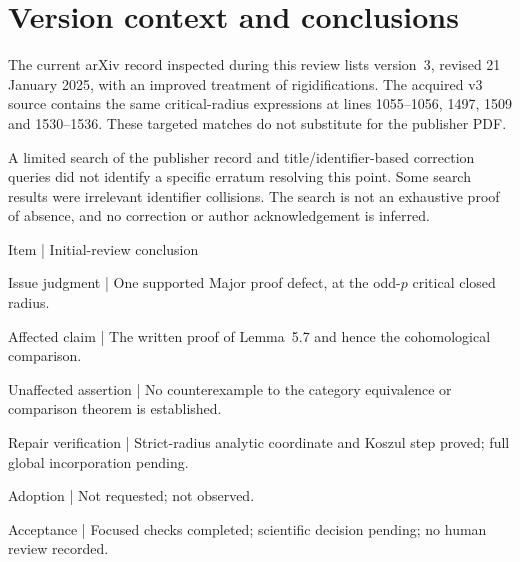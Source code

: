 \documentclass[10pt]{article}
\begin{document}
\section*{Version context and conclusions}
The current arXiv record inspected during this review lists version 3, revised 21 January 2025, with an improved treatment of rigidifications. The acquired v3 source contains the same critical-radius expressions at lines 1055–1056, 1497, 1509 and 1530–1536. These targeted matches do not substitute for the publisher PDF.\par
A limited search of the publisher record and title/identifier-based correction queries did not identify a specific erratum resolving this point. Some search results were irrelevant identifier collisions. The search is not an exhaustive proof of absence, and no correction or author acknowledgement is inferred.\par
Item | Initial-review conclusion\par
Issue judgment | One supported Major proof defect, at the odd-\(p\) critical closed radius.\par
Affected claim | The written proof of Lemma 5.7 and hence the cohomological comparison.\par
Unaffected assertion | No counterexample to the category equivalence or comparison theorem is established.\par
Repair verification | Strict-radius analytic coordinate and Koszul step proved; full global incorporation pending.\par
Adoption | Not requested; not observed.\par
Acceptance | Focused checks completed; scientific decision pending; no human review recorded.\par
\end{document}
